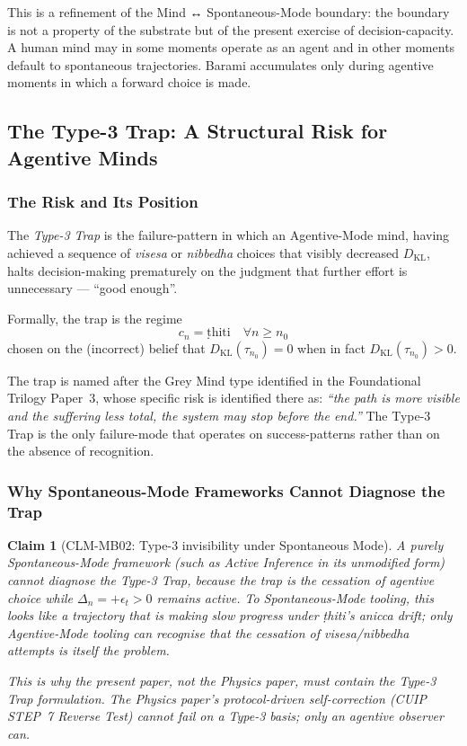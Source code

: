 \documentclass[12pt, a4paper]{article}
\newtheorem{claim}{Claim}[section]
\begin{document}
This is a refinement of the Mind ↔ Spontaneous-Mode boundary: the
boundary is not a property of the substrate but of the present
exercise of decision-capacity. A human mind may in some moments
operate as an agent and in other moments default to spontaneous
trajectories. Barami accumulates only during agentive moments in
which a forward choice is made.

\subsection{The Type-3 Trap: A Structural Risk for Agentive Minds}

\subsubsection{The Risk and Its Position}

\begin{formalbox}[title={DEF-MB07: The Type-3 Trap}]
The \emph{Type-3 Trap} is the failure-pattern in which an Agentive-Mode
mind, having achieved a sequence of \emph{visesa} or \emph{nibbedha}
choices that visibly decreased $D_{\mathrm{KL}}$, halts decision-making
prematurely on the judgment that further effort is unnecessary ---
``good enough''.

Formally, the trap is the regime
\[
  c_n = \text{ṭhiti} \quad \forall n \ge n_0
\]
chosen on the (incorrect) belief that
$D_{\mathrm{KL}}(\tau_{n_0}) = 0$ when in fact
$D_{\mathrm{KL}}(\tau_{n_0}) > 0$.

The trap is named after the Grey Mind type identified in the
Foundational Trilogy Paper~3, whose specific risk is identified there
as: \emph{``the path is more visible and the suffering less total,
the system may stop before the end.''} The Type-3 Trap is the only
failure-mode that operates on success-patterns rather than on the
absence of recognition.
\end{formalbox}

\subsubsection{Why Spontaneous-Mode Frameworks Cannot Diagnose the Trap}

\begin{claim}[CLM-MB02: Type-3 invisibility under Spontaneous Mode]
\label{mbv1:clm:mb02}
A purely Spontaneous-Mode framework (such as Active Inference in its
unmodified form) cannot diagnose the Type-3 Trap, because the trap
is the cessation of agentive choice while $\Delta_n = +\epsilon_t > 0$
remains active. To Spontaneous-Mode tooling, this looks like a
trajectory that is making slow progress under \emph{ṭhiti}'s
\emph{anicca} drift; only Agentive-Mode tooling can recognise that
the cessation of \emph{visesa}/\emph{nibbedha} attempts is itself the
problem.

This is why the present paper, not the Physics paper, must contain
the Type-3 Trap formulation. The Physics paper's protocol-driven
self-correction (CUIP STEP~7 Reverse Test) cannot fail on a Type-3
basis; only an agentive observer can.
\end{claim}
\end{document}
